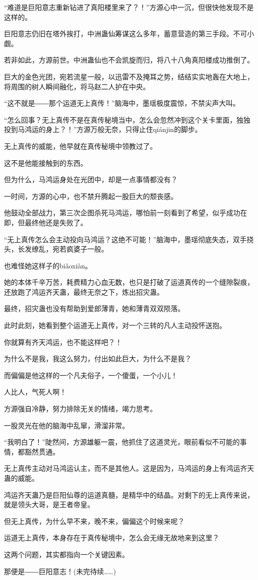 \begin{this_body}
“难道是巨阳意志重新钻进了真阳楼里来了？！”方源心中一沉，但很快他发现不是这样的。

巨阳意志仍旧在塔外挨打，中洲蛊仙筹谋这么多年，蓄意营造的第三手段。不可小觑。

若非如此，方源前世。中洲蛊仙也不会凯旋而归，将八十八角真阳楼成功推倒了。

巨大的金色光团，宛若流星一般，以迅雷不及掩耳之势，结结实实地轰在大地上，将周围的树人瞬间融化，将马赵二人护在中央。

“这不就是――那个运道无上真传！”脑海中，墨瑶极度震惊，不禁尖声大叫。

“怎么回事？无上真传不是在真传秘境当中，怎么会忽然冲到这个关卡里面，独独投到马鸿运的身上？！”方源万般无奈，只得止住qiánjin的脚步。

无上真传的威能，他早就在真传秘境中领教过了。

这不是他能接触到的东西。

但为什么，马鸿运身处在光团中，却是一点事情都没有？

一时间，方源的心中，也不禁升腾起一股巨大的颓丧感。

他鼓动全部战力，第三次企图杀死马鸿运，哪怕前一刻看到了希望，似乎成功在即，但最终他还是失败了。

“无上真传怎么会主动投向马鸿运？这绝不可能！”脑海中，墨瑶彻底失态，双手挠头，长发缭乱，宛若疯婆子一般。

也难怪她这样子的biǎoxiàn。

她的本体千辛万苦，耗费精力心血无数，也只是打破了运道真传的一个缝隙裂痕，还放跑了鸿运齐天蛊，最终无奈之下，炼出招灾蛊。

最终，招灾蛊也没有帮助到爱郎薄青，她和薄青双双陨落。

此时此刻，她看到整个运道无上真传，对一个三转的凡人主动投怀送抱。

你就算有齐天鸿运，也不能这样吧？！

为什么不是我，我这么努力，付出如此巨大，为什么不是我？

而偏偏是他这样的一个凡夫俗子，一个傻蛋，一个小儿！

人比人，气死人啊！

方源强自冷静，努力排除无关的情绪，竭力思考。

一股灵光在他的脑海中乱窜，滑溜非常。

“我明白了！”陡然间，方源雄躯一震，他抓住了这道灵光，眼前看似不可能的事情，都豁然贯通。

无上真传主动对马鸿运认主，而不是其他人。这是因为，马鸿运的身上有鸿运齐天蛊的威能。

鸿运齐天蛊乃是巨阳仙尊的运道真髓，是精华中的结晶。对剩下的无上真传来说，就是领头大哥，是王者帝皇。

但无上真传，为什么早不来，晚不来，偏偏这个时候来呢？

运道无上真传，本身存在于真传秘境中，怎么会无缘无故地来到这里？

这两个问题，其实都指向一个关键因素。

那便是――巨阳意志！(未完待续……)

\end{this_body}

